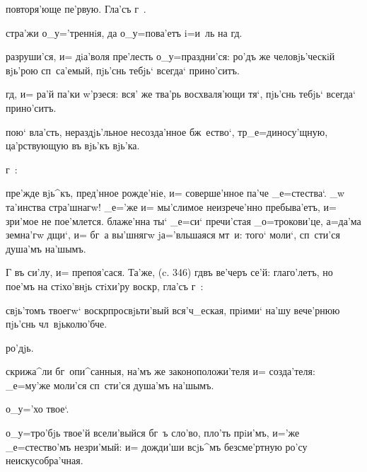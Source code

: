 
повторя'юще пе'рвую. Гла'съ г~.%

стра'жи о_у='треннiя, да о_у=пова'етъ i=и~ль на гд.

разруши'ся, и= дiа'воля пре'лесть о_у=праздни'ся: ро'дъ 
же человjь'ческiй вjь'рою сп~са'емый, пjь'снь тебjь` 
всегда` прино'ситъ.

гд, и= ра'й па'ки w'рзеся: вся' же тва'рь 
восхваля'ющи тя`, пjь'снь тебjь` всегда` прино'ситъ.

пою` вла'сть, нераздjь'льное несозда'нное бж~ество`, 
тр _е=диносу'щную, ца'рствующую въ вjь'къ вjь'ка.

г~:%

пре'жде вjь^къ, пред'нное рожде'нiе, и= 
соверше'нное па'че _е=стества`. _w та'инства стра'шнагw! 
_е='же и= мы'слимое неизрече'нно пребыва'етъ, и= зри'мое 
не пое'млется. блаже'нна ты` _е=си` пречи'стая 
_о=трокови'це, а=да'ма земна'гw дщи`, и= бг~а вы'шнягw 
jа='вльшаяся мт~и: того` моли`, сп~сти'ся душа'мъ 
на'шымъ.

Г%
въ си'лу, и= препоя'сася. Та'же, (c. 346) %
гд въ ве'черъ се'й: %
глаго'летъ, но пое'мъ на стiхо'внjь стiхи'ру воскр, 
гла'съ г~:%

свjь'томъ твоегw` воскр просвjьти'вый вся'ч_еская, 
прiими` на'шу вече'рнюю пjь'снь чл~вjьколю'бче.


ро'дjь.

скрижа^ли бг~опи^санныя, на'мъ же законоположи'теля и= 
созда'теля: _е=му'же моли'ся сп~сти'ся душа'мъ на'шымъ.

о_у='хо твое`.

о_у=тро'бjь твое'й всели'выйся бг~ъ сло'во, пло'ть 
прiи'мъ, и='же _е=стество'мъ незри'мый: и= дожди'ши 
всjь^мъ безсме'ртную ро'су неискусобра'чная.

